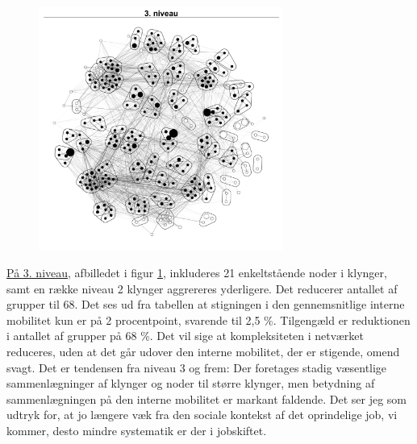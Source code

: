 \begin{figure}
  \vspace{-20pt}
  \begin{center}
   \caption{}
   \label{fig_delanalyse1_kort_seg_proces3}
    \includegraphics[width=8cm]{fig/netvaerkskort/kort_seg_proces3.pdf}
  \end{center}
  \vspace{-20pt}
\end{figure}

\underline{På 3. niveau}, afbilledet i figur \ref{fig_delanalyse1_kort_seg_proces3}, inkluderes 21 enkeltstående noder i klynger, samt en række niveau 2 klynger aggrereres yderligere. Det reducerer antallet af grupper til 68. Det ses ud fra tabellen at stigningen i den gennemsnitlige interne mobilitet kun er på 2 procentpoint, svarende til 2,5 \%. Tilgengæld er reduktionen i antallet af grupper på 68 \%. Det vil sige at kompleksiteten i netværket reduceres, uden at det går udover den interne mobilitet, der er stigende, omend svagt. Det er tendensen fra niveau 3 og frem: Der foretages stadig væsentlige sammenlægninger af klynger og noder til større klynger, men betydning af sammenlægningen på den interne mobilitet er markant faldende. Det ser jeg som udtryk for, at jo længere væk fra den sociale kontekst af det oprindelige job, vi kommer, desto mindre systematik er der i jobskiftet.

